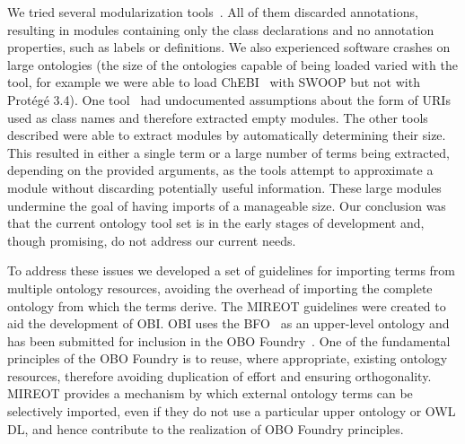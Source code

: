 \documentclass[jou]{ao2e}%
\begin{document}
We tried several modularization tools~\citep{Grau2, Jimenez,Seidenberg,Sirin}. 
All of them discarded annotations, resulting in modules containing only the class declarations and no annotation properties, such as labels or definitions.
We also experienced software crashes on large ontologies (the size of the ontologies capable of being loaded varied with the tool, for example we were able to load ChEBI~\citep{ChEBI} with SWOOP but not with Prot\'eg\'e 3.4).
One tool~\citep{Seidenberg} %
had undocumented assumptions about the form of URIs used as class names and therefore extracted empty modules. 
The other tools described %
were able to extract modules by automatically determining their size. This resulted in either a single term or a large number of terms being extracted, depending on the provided arguments, as the tools attempt to approximate a module without discarding potentially useful information. These large modules undermine the goal of having imports of a manageable size.
Our conclusion was that the current ontology tool set is in the early stages of development and, though promising, do not address our current needs.

To address these issues we developed a set of guidelines for importing terms from multiple ontology resources, avoiding the overhead of importing the complete ontology from which the terms derive. 
The \ac{MIREOT} guidelines were created to aid the development of \ac{OBI}.
\ac{OBI} uses the \ac{BFO}~\cite{BFO} as an upper-level ontology and has been submitted for inclusion in the \ac{OBO} Foundry~\citep{OBOFoundry}. 
One of the fundamental principles of the \ac{OBO} Foundry is to reuse, where appropriate, existing ontology resources, therefore avoiding duplication of effort and ensuring orthogonality.
\ac{MIREOT} provides a mechanism by which external ontology terms can be selectively imported, even if they do not use a particular upper ontology or OWL DL, and hence contribute to the realization of OBO Foundry principles.
\end{document}
